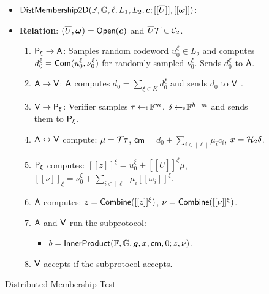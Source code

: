 \begin{figure}[h!]
\centering
\begin{framed}
\begin{itemize}
\item $\mathsf{DistMembership2D}(\mathbb{F},\mathbb{G},\ell,L_1,L_2,\bm{c};[[\overline{U}]],[[\bm{\omega}]])$:
\item {\bf Relation}: $(\overline{U},\bm{\omega})=\mathsf{Open}(\bm{c})$ and
$\overline{U}\mathcal{T}\in \mathcal{C}_2$.
\begin{enumerate}[{\rm 1.}]
\item $\mathsf{P}_\xi\rightarrow \mathsf{A}$: Samples random codeword $u^\xi_0\in L_2$ and
computes $d^\xi_0=\mathsf{Com}(u^\xi_0,\nu^\xi_0)$ for randomly sampled $\nu^\xi_0$.
Sends $d^\xi_0$ to $\mathsf{A}$.
\item {\color{red} $\mathsf{A}\rightarrow \mathsf{V}$: $\mathsf{A}$ computes $d_0=\sum_{\xi\in
K}d^\xi_0$ and sends $d_0$ to $\mathsf{V}$ }.
\item $\mathsf{V}\rightarrow \mathsf{P}_\xi$: Verifier samples $\tau\hskip2.3pt{\gets\!\!\mbox{\tiny${\$}$\normalsize}}\, \mathbb{F}^m$,
$\delta\hskip2.3pt{\gets\!\!\mbox{\tiny${\$}$\normalsize}}\, \mathbb{F}^{h-m}$ and sends them to $\mathsf{P}_\xi$.
\item $\mathsf{A}\leftrightarrow \mathsf{V}$ compute: $\mu=\mathcal{T}\tau$,
$\mathsf{cm}=d_0+\sum_{i\in [\ell]}\mu_ic_i$, $x=\mathcal{H}_2\delta$.
\item $\mathsf{P}_\xi$ computes: $[[z]]^\xi=u^\xi_0+[[\overline{U}]]^\xi\mu$,
$[[\nu]]_\xi=\nu^\xi_0+\sum_{i\in [\ell]}\mu_i[[\omega_i]]^\xi$.
\item {\color{red} $\mathsf{A}$ computes: $z=\mathsf{Combine}([[z]]^\xi)$,
$\nu=\mathsf{Combine}([[\nu]]^\xi)$}.
\item $\mathsf{A}$ and $\mathsf{V}$ run the subprotocol:
	\begin{itemize}
	\item $b=\mathsf{InnerProduct}(\mathbb{F},\mathbb{G},\bm{g},x,\mathsf{cm},0;z,\nu)$.
	\end{itemize}
\item $\mathsf{V}$ accepts if the subprotocol accepts.
\end{enumerate}
\end{itemize}
\end{framed}
\caption{Distributed Membership Test}
\label{fig:distprox2d}
\end{figure}


